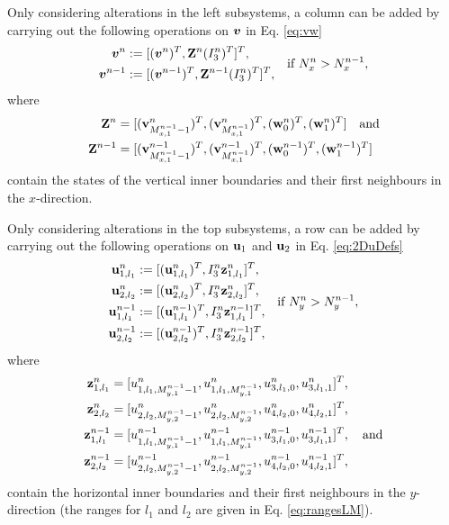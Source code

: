 \documentclass[fleqn]{jaes}
\begin{document}
Only considering alterations in the left subsystems, a column can be added by carrying out the following operations on $\boldsymbol{v}$ in Eq. \eqref{eq:vw}
\begin{equation}
\begin{aligned}
   \vv^n &:= [(\vv^n)^T, \Z^n(I_3^n)^T]^T,\\
   \vv^{n-1} &:= [(\vv^{n-1})^T, \Z^{n-1}(I_3^n)^T]^T,
   \end{aligned} \quad \text{if } N_x^n > N_x^{n-1},
\end{equation}
where
\begin{align*}
\Z^n &= [(\v_{M_{x,1}^{n-1}-1}^n)^T, (\v_{M_{x,1}^{n-1}}^n)^T, (\w_{0}^n)^T, (\w_{1}^n)^T] \quad \text{and}\\
\Z^{n-1} &= [(\v_{M_{x,1}^{n-1}-1}^{n-1})^T, (\v_{M_{x,1}^{n-1}}^{n-1})^T, (\w_{0}^{n-1})^T, (\w_{1}^{n-1})^T]
\end{align*}
contain the states of the vertical inner boundaries and their first neighbours in the $x$-direction. 

Only considering alterations in the top subsystems, a row can be added by carrying out the following operations on $\mathbf{u}_1$ and $\mathbf{u}_2$ in Eq. \eqref{eq:2DuDefs} 
\begin{equation*}
    \begin{aligned}
        \u_{1,l_1}^n &:= [(\u_{1,l_1}^n)^T, I_3^n \z_{1, l_1}^n]^T,\\
        \u_{2,l_2}^n &:= [(\u_{2,l_2}^n)^T, I_3^n \z_{2, l_2}^n]^T,\\
        \u_{1,l_1}^{n-1} &:= [(\u_{1,l_1}^{n-1})^T, I_3^n \z_{1, l_1}^{n-1}]^T,\\
        \u_{2,l_2}^{n-1} &:= [(\u_{2,l_2}^{n-1})^T, I_3^n \z_{2, l_2}^{n-1}]^T,
    \end{aligned}\quad \text{if } N_y^n > N_y^{n-1},
\end{equation*}
where 
\begin{align*}
    \z_{1,l_1}^n &= [u_{1, l_1, M_{y,1}^{n-1}-1}^n, u_{1, l_1, M_{y,1}^{n-1}}^n, u_{3, l_1, 0}^n, u_{3, l_1, 1}^n]^T,\\
    \z_{2,l_2}^n &= [u_{2, l_2, M_{y,2}^{n-1}-1}^n, u_{2, l_2, M_{y,2}^{n-1}}^n, u_{4, l_2, 0}^n, u_{4, l_2, 1}^n]^T,\\
    \z_{1,l_1}^{n-1} &= [u_{1, l_1, M_{y,1}^{n-1}-1}^{n-1}, u_{1, l_1, M_{y,1}^{n-1}}^{n-1}, u_{3, l_1, 0}^{n-1}, u_{3, l_1, 1}^{n-1}]^T, \quad \text{and}\\
    \z_{2,l_2}^{n-1} &= [u_{2, l_2, M_{y,2}^{n-1}-1}^{n-1}, u_{2, l_2, M_{y,2}^{n-1}}^{n-1}, u_{4, l_2, 0}^{n-1}, u_{4, l_2, 1}^{n-1}]^T,
\end{align*}
contain the horizontal inner boundaries and their first neighbours in the $y$-direction (the ranges for $l_1$ and $l_2$ are given in Eq. \eqref{eq:rangesLM}).
\end{document}
